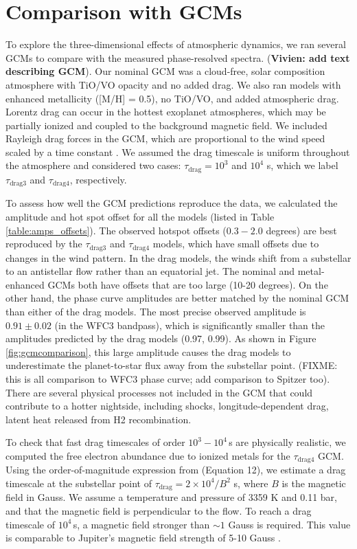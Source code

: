 \documentclass[twocolumn]{aastex61}
\begin{document}
\section{Comparison with GCMs}
\label{sec:gcm}
To explore the three-dimensional effects of atmospheric dynamics, we ran several GCMs to compare with the measured phase-resolved spectra. (\textbf{Vivien: add text describing GCM}).  Our nominal GCM was a cloud-free, solar composition atmosphere with TiO/VO opacity and no added drag.  We also ran models with enhanced metallicity ([M/H] = 0.5), no TiO/VO, and added atmospheric drag.  Lorentz drag can occur in the hottest exoplanet atmospheres, which may be partially ionized and coupled to the background magnetic field. We included Rayleigh drag forces in the GCM, which are proportional to the wind speed scaled by a time constant \citep[$F_\mathrm{drag} \propto -v/\tau_\mathrm{drag}$;][]{menou09}. We assumed the drag timescale is uniform throughout the atmosphere and considered two cases: $\tau_\mathrm{drag} = 10^3$ and $10^4$ s, which we label $\tau_\mathrm{drag3}$ and $\tau_\mathrm{drag4}$, respectively.

To assess how well the GCM predictions reproduce the data, we calculated the amplitude and hot spot offset for all the models (listed in Table\,\ref{table:amps_offsets}). The observed hotspot offsets ($0.3 - 2.0$ degrees) are best reproduced by the $\tau_\mathrm{drag3}$ and $\tau_\mathrm{drag4}$ models, which have small offsets due to changes in the wind pattern. In the drag models, the winds shift from a substellar to an antistellar flow rather than an equatorial jet.  The nominal and metal-enhanced GCMs both have offsets that are too large (10-20 degrees). On the other hand, the phase curve amplitudes are better matched by the nominal GCM than either of the drag models. The most precise observed amplitude is $0.91\pm0.02$ (in the WFC3 bandpass), which is significantly smaller than the amplitudes predicted by the drag models (0.97, 0.99). As shown in Figure\,\ref{fig:gcmcomparison}, this large amplitude causes the drag models to underestimate the planet-to-star flux away from the substellar point. (FIXME: this is all comparison to WFC3 phase curve; add comparison to Spitzer too). There are several physical processes not included in the GCM that could contribute to a hotter nightside, including shocks, longitude-dependent drag, latent heat released from H2 recombination. 

To check that fast drag timescales of order $10^3 - 10^4$\,s are physically realistic, we computed the free electron abundance due to ionized metals for the $\tau_\mathrm{drag4}$ GCM. Using the order-of-magnitude expression from \cite{perna10} (Equation 12), we estimate a drag timescale at the substellar point of $\tau_\mathrm{drag}  = 2\times10^4/B^2$ s, where $B$ is the magnetic field in Gauss. We assume a temperature and pressure of 3359 K and 0.11 bar, and that the magnetic field is perpendicular to the flow. To reach a drag timescale of $10^4$\,s, a magnetic field stronger than $\sim1$ Gauss is required. This value is comparable to Jupiter's magnetic field strength of 5-10 Gauss \citep{bagenal04}.
\end{document}
